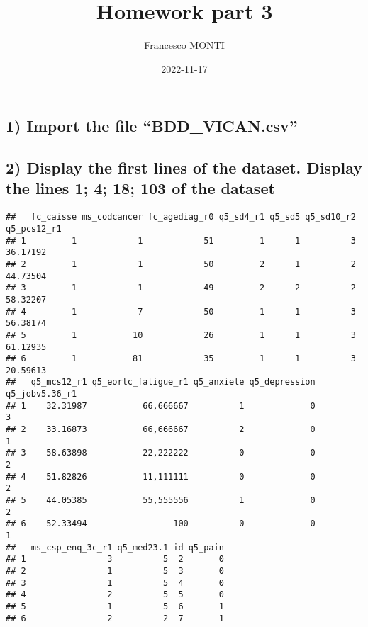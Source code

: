 \documentclass[
]{article}
\title{Homework part 3}
\author{Francesco MONTI}
\date{2022-11-17}
\newenvironment{Shaded}{\begin{snugshade}}{\end{snugshade}}
\newcommand{\AttributeTok}[1]{\textcolor[rgb]{0.77,0.63,0.00}{#1}}
\newcommand{\CommentTok}[1]{\textcolor[rgb]{0.56,0.35,0.01}{\textit{#1}}}
\newcommand{\FunctionTok}[1]{\textcolor[rgb]{0.00,0.00,0.00}{#1}}
\newcommand{\NormalTok}[1]{#1}
\newcommand{\SpecialCharTok}[1]{\textcolor[rgb]{0.00,0.00,0.00}{#1}}
\begin{document}
\maketitle

\begin{Shaded}
\end{Shaded}

\hypertarget{import-the-file-bdd_vican.csv}{%
\subsection{1) Import the file
``BDD\_VICAN.csv''}\label{import-the-file-bdd_vican.csv}}

\hypertarget{display-the-first-lines-of-the-dataset.-display-the-lines-1-4-18-103-of-the-dataset}{%
\subsection{2) Display the first lines of the dataset. Display the lines
1; 4; 18; 103 of the
dataset}\label{display-the-first-lines-of-the-dataset.-display-the-lines-1-4-18-103-of-the-dataset}}

\begin{verbatim}
##   fc_caisse ms_codcancer fc_agediag_r0 q5_sd4_r1 q5_sd5 q5_sd10_r2 q5_pcs12_r1
## 1         1            1            51         1      1          3    36.17192
## 2         1            1            50         2      1          2    44.73504
## 3         1            1            49         2      2          2    58.32207
## 4         1            7            50         1      1          3    56.38174
## 5         1           10            26         1      1          3    61.12935
## 6         1           81            35         1      1          3    20.59613
##   q5_mcs12_r1 q5_eortc_fatigue_r1 q5_anxiete q5_depression q5_jobv5.36_r1
## 1    32.31987           66,666667          1             0              3
## 2    33.16873           66,666667          2             0              1
## 3    58.63898           22,222222          0             0              2
## 4    51.82826           11,111111          0             0              2
## 5    44.05385           55,555556          1             0              2
## 6    52.33494                 100          0             0              1
##   ms_csp_enq_3c_r1 q5_med23.1 id q5_pain
## 1                3          5  2       0
## 2                1          5  3       0
## 3                1          5  4       0
## 4                2          5  5       0
## 5                1          5  6       1
## 6                2          2  7       1
\end{verbatim}
\end{document}
